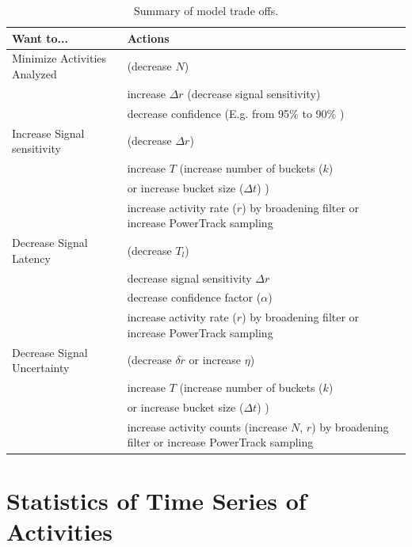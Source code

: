 \documentclass{article}
\begin{document}
\begin{table}
\caption{Summary of model trade offs.}
\label{tab:tradeoff}
    \begin{tabular}{l| m{7cm}}
     \hline
Want to...  & Actions \\
\hline
Minimize Activities Analyzed   & (decrease $N$)  \\
                                  & increase $\Delta r$ (decrease signal sensitivity)  \\
                                  & decrease confidence (E.g. from 95\% to 90\% )  \\
\hline	
Increase Signal sensitivity   & (decrease $\Delta r$)  \\
                                  & increase $T$ (increase number of buckets ($k$)  \\
                                  & or increase bucket size ($\Delta t$) )  \\
                                  & increase activity rate ($r$) by broadening filter or increase PowerTrack sampling \\
\hline
Decrease Signal Latency      & (decrease $T_l$)  \\
                                 & decrease signal sensitivity $\Delta r$  \\
                                 & decrease confidence factor ($\alpha$) \\
                                 & increase activity rate ($r$) by broadening filter or increase PowerTrack sampling \\
\hline
Decrease Signal Uncertainty & (decrease $\delta r$ or increase $\eta$) \\
                          	  & increase $T$ (increase number of buckets ($k$)  \\
                                 & or increase bucket size ($\Delta t$) )  \\
                                 & increase activity counts (increase $N$, $r$) by broadening filter or increase PowerTrack sampling \\
\hline
\end{tabular}

\end{table}


\section{Statistics of Time Series of Activities} 
\end{document}
